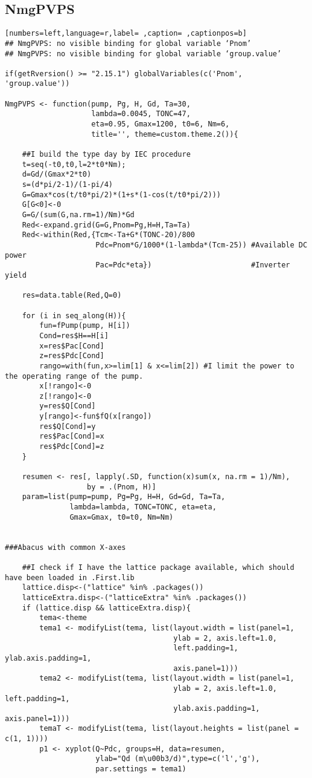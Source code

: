 \subsection{NmgPVPS}
\label{sec:orgbba8156}
\begin{lstlisting}[numbers=left,language=r,label= ,caption= ,captionpos=b]
## NmgPVPS: no visible binding for global variable ‘Pnom’
## NmgPVPS: no visible binding for global variable ‘group.value’

if(getRversion() >= "2.15.1") globalVariables(c('Pnom', 'group.value'))

NmgPVPS <- function(pump, Pg, H, Gd, Ta=30,
                    lambda=0.0045, TONC=47,
                    eta=0.95, Gmax=1200, t0=6, Nm=6,
                    title='', theme=custom.theme.2()){

    ##I build the type day by IEC procedure
    t=seq(-t0,t0,l=2*t0*Nm);
    d=Gd/(Gmax*2*t0)
    s=(d*pi/2-1)/(1-pi/4)
    G=Gmax*cos(t/t0*pi/2)*(1+s*(1-cos(t/t0*pi/2)))
    G[G<0]<-0
    G=G/(sum(G,na.rm=1)/Nm)*Gd
    Red<-expand.grid(G=G,Pnom=Pg,H=H,Ta=Ta)
    Red<-within(Red,{Tcm<-Ta+G*(TONC-20)/800
                     Pdc=Pnom*G/1000*(1-lambda*(Tcm-25)) #Available DC power
                     Pac=Pdc*eta})                       #Inverter yield

    res=data.table(Red,Q=0)

    for (i in seq_along(H)){
        fun=fPump(pump, H[i])
        Cond=res$H==H[i]
        x=res$Pac[Cond]
        z=res$Pdc[Cond]
        rango=with(fun,x>=lim[1] & x<=lim[2]) #I limit the power to the operating range of the pump.
        x[!rango]<-0
        z[!rango]<-0
        y=res$Q[Cond]
        y[rango]<-fun$fQ(x[rango])
        res$Q[Cond]=y
        res$Pac[Cond]=x
        res$Pdc[Cond]=z
    }

    resumen <- res[, lapply(.SD, function(x)sum(x, na.rm = 1)/Nm),
                   by = .(Pnom, H)]
    param=list(pump=pump, Pg=Pg, H=H, Gd=Gd, Ta=Ta,
               lambda=lambda, TONC=TONC, eta=eta,
               Gmax=Gmax, t0=t0, Nm=Nm)


###Abacus with common X-axes

    ##I check if I have the lattice package available, which should have been loaded in .First.lib
    lattice.disp<-("lattice" %in% .packages())
    latticeExtra.disp<-("latticeExtra" %in% .packages())
    if (lattice.disp && latticeExtra.disp){
        tema<-theme
        tema1 <- modifyList(tema, list(layout.width = list(panel=1,
                                       ylab = 2, axis.left=1.0,
                                       left.padding=1, ylab.axis.padding=1,
                                       axis.panel=1)))
        tema2 <- modifyList(tema, list(layout.width = list(panel=1,
                                       ylab = 2, axis.left=1.0, left.padding=1,
                                       ylab.axis.padding=1, axis.panel=1)))
        temaT <- modifyList(tema, list(layout.heights = list(panel = c(1, 1))))
        p1 <- xyplot(Q~Pdc, groups=H, data=resumen,
                     ylab="Qd (m\u00b3/d)",type=c('l','g'),
                     par.settings = tema1)


\end{lstlisting}
